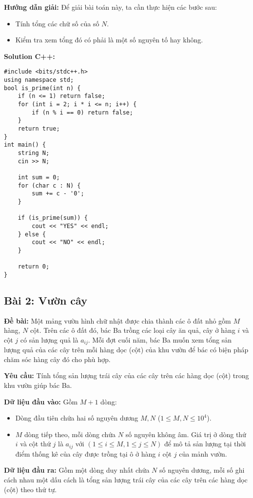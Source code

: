 \documentclass[12pt]{scrartcl}  %
\begin{document}
\textbf{Hướng dẫn giải:}
Để giải bài toán này, ta cần thực hiện các bước sau:
\begin{itemize}
    \item Tính tổng các chữ số của số $N$.
    \item Kiểm tra xem tổng đó có phải là một số nguyên tố hay không.
\end{itemize}
\textbf{Solution C++:}
\begin{lstlisting}
#include <bits/stdc++.h>
using namespace std;
bool is_prime(int n) {
    if (n <= 1) return false;
    for (int i = 2; i * i <= n; i++) {
        if (n % i == 0) return false;
    }
    return true;
}
int main() {
    string N;
    cin >> N;

    int sum = 0;
    for (char c : N) {
        sum += c - '0'; 
    }

    if (is_prime(sum)) {
        cout << "YES" << endl;
    } else {
        cout << "NO" << endl;
    }

    return 0;
}
\end{lstlisting}

\subsection{Bài 2: Vườn cây}
\textbf{Đề bài:}
Một mảng vườn hình chữ nhật được chia thành các ô đất nhỏ gồm $M$ hàng, $N$ cột. Trên các ô đất 
đó, bác Ba trồng các loại cây ăn quả, cây ở hàng $i$ và cột $j$ có sản lượng quả là $a_{ij}$. Mỗi đợt cuối năm, 
bác Ba muốn xem tổng sản lượng quả của các cây trên mỗi hàng dọc (cột) của khu vườn để bác có biện pháp chăm sóc hàng cây đó cho phù hợp.

\textbf{Yêu cầu:}
Tính tổng sản lượng trái cây của các cây trên các hàng dọc (cột) trong khu vườn giúp bác Ba. 

\textbf{Dữ liệu đầu vào:}
Gồm $M + 1$ dòng:
\begin{itemize}
    \item Dòng đầu tiên chứa hai số nguyên dương $M, N$ ($1 \leq M, N \leq 10^4$).
    \item $M$ dòng tiếp theo, mỗi dòng chứa $N$ số nguyên không âm. Giá trị ở dòng thứ $i$ và cột thứ $j$ là $a_{ij}$ với $(1 \leq i \leq M, 1 \leq j \leq N)$ để mô tả sản lượng tại thời điểm thống kê của cây được trồng tại ô ở hàng $i$ cột $j$ của mảnh vườn. 
\end{itemize}

\textbf{Dữ liệu đầu ra:}
Gồm một dòng duy nhất chứa $N$ số nguyên dương, mỗi số ghi cách nhau một dấu cách là tổng sản lượng trái cây của các cây trên các hàng dọc (cột) theo thứ tự. 
\end{document}
